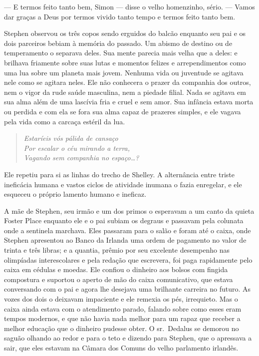  --- E termos feito tanto bem, Simon --- disse o velho homenzinho, sério.
 --- Vamos dar graças a Deus por termos vivido tanto tempo e termos feito
tanto bem.

Stephen observou os três copos sendo erguidos do balcão enquanto seu pai
e os dois parceiros bebiam à memória do passado. Um abismo de destino
ou de temperamento o separava deles. Sua mente parecia mais velha que a
deles: e brilhava friamente sobre suas lutas e momentos felizes e
arrependimentos como uma lua sobre um planeta mais jovem. Nenhuma vida
ou juventude se agitava nele como se agitara neles. Ele não conhecera o
prazer da companhia dos outros, nem o vigor da rude saúde masculina,
nem a piedade filial. Nada se agitava em sua alma além de uma lascívia
fria e cruel e sem amor. Sua infância estava morta ou perdida e com ela
se fora sua alma capaz de prazeres simples, e ele vagava pela vida como
a carcaça estéril da lua.

\begin{verse}\itshape
Estaríeis vós pálida de cansaço\\
Por escalar o céu mirando a terra,\\
Vagando sem companhia no espaço\ldots{}?
\end{verse}

Ele repetiu para si as linhas do trecho de Shelley. A alternância entre
triste ineficácia humana e vastos ciclos de atividade inumana o fazia
enregelar, e ele esqueceu o próprio lamento humano e ineficaz.

\asterisc

A mãe de Stephen, seu irmão e um dos primos o esperavam a um canto da
quieta Foster Place enquanto ele e o pai subiam os degraus e passavam
pela colunata onde a sentinela marchava. Eles passaram para o salão e
foram até o caixa, onde Stephen apresentou ao Banco da Irlanda uma ordem
de pagamento no valor de trinta e três libras; e a quantia, prêmio por
seu excelente desempenho nas olimpíadas interescolares e pela redação
que escrevera, foi paga rapidamente pelo caixa em cédulas e moedas. Ele
confiou o dinheiro aos bolsos com fingida compostura e suportou o
aperto de mão do caixa comunicativo, que estava conversando com o pai e
agora lhe desejava uma brilhante carreira no futuro. As vozes dos dois
o deixavam impaciente e ele remexia os pés, irrequieto. Mas o caixa
ainda estava com o atendimento parado, falando sobre como esses eram
tempos modernos, e que não havia nada melhor para um rapaz que receber
a melhor educação que o dinheiro pudesse obter. O sr.~Dedalus se
demorou no saguão olhando ao redor e para o teto e dizendo para
Stephen, que o apressava a sair, que eles estavam na Câmara dos Comuns
do velho parlamento irlandês.

